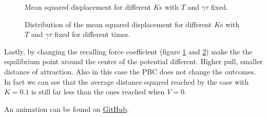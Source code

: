 \documentclass[../main.tex]{subfiles}
\begin{document}
\begin{figure}[!ht]
    \centering
    \begin{subfigure}{.99\textwidth}
        \centering
        
    \end{subfigure}
    \caption{Mean squared displacement for different $K$s with $T$ and $\gamma\tau$ fixed.}
    \label{fig: ex_11_VHO_ks}
\end{figure}
\begin{figure}[!ht]
    \centering
    \begin{subfigure}{.99\textwidth}
        \centering
        
    \end{subfigure}
    \caption{Distribution of the mean squared displacement for different $K$s with $T$ and $\gamma\tau$ fixed for different times.}
    \label{fig: ex_11_VHO_ks_distrib}
\end{figure}

Lastly, by changing the recalling force coefficient (figure \ref{fig: ex_11_VHO_ks} and \ref{fig: ex_11_VHO_ks_distrib}) make the the equilibrium point around the center of the potential different. Higher pull, smaller distance of attraction. Also in this case the PBC does not change the outcomes. In fact we can see that the average distance squared reached by the case with $K=0.1$ is still far less than the ones reached when $V=0$.

An animation can be found on \href{https://github.com/EmanueleSarte/nmsm/blob/main/ex11/README.md}{GitHub}.
\end{document}
